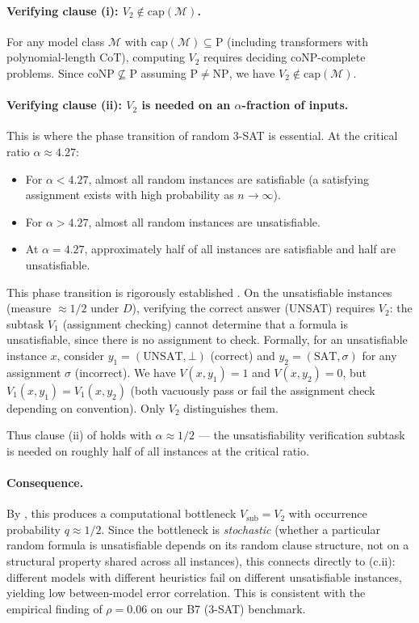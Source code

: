 \documentclass{article}
\theoremstyle{definition}
\theoremstyle{remark}
\newcommand{\PTIME}{\mathrm{P}}
\newcommand{\NP}{\mathrm{NP}}
\newcommand{\coNP}{\mathrm{coNP}}
\newcommand{\calM}{\mathcal{M}}         %
\begin{document}
\paragraph{Verifying clause (i): $V_2 \notin \mathrm{cap}(\calM)$.}
For any model class $\calM$ with $\mathrm{cap}(\calM) \subseteq \PTIME$ (including transformers with polynomial-length CoT), computing $V_2$ requires deciding $\coNP$-complete problems. Since $\coNP \not\subseteq \PTIME$ assuming $\PTIME \neq \NP$, we have $V_2 \notin \mathrm{cap}(\calM)$.

\paragraph{Verifying clause (ii): $V_2$ is needed on an $\alpha$-fraction of inputs.}
This is where the phase transition of random 3-SAT is essential. At the critical ratio $\alpha \approx 4.27$:
\begin{itemize}
    \item For $\alpha < 4.27$, almost all random instances are satisfiable (a satisfying assignment exists with high probability as $n \to \infty$).
    \item For $\alpha > 4.27$, almost all random instances are unsatisfiable.
    \item At $\alpha = 4.27$, approximately half of all instances are satisfiable and half are unsatisfiable.
\end{itemize}
This phase transition is rigorously established \citep{mezard2002analytic}.
On the unsatisfiable instances (measure $\approx 1/2$ under $D$), verifying the correct answer (UNSAT) requires $V_2$: the subtask $V_1$ (assignment checking) cannot determine that a formula is unsatisfiable, since there is no assignment to check.
Formally, for an unsatisfiable instance $x$, consider $y_1 = (\text{UNSAT}, \bot)$ (correct) and $y_2 = (\text{SAT}, \sigma)$ for any assignment $\sigma$ (incorrect). We have $V(x, y_1) = 1$ and $V(x, y_2) = 0$, but $V_1(x, y_1) = V_1(x, y_2)$ (both vacuously pass or fail the assignment check depending on convention). Only $V_2$ distinguishes them.

Thus clause (ii) of  holds with $\alpha \approx 1/2$ --- the unsatisfiability verification subtask is needed on roughly half of all instances at the critical ratio.

\paragraph{Consequence.}
By , this produces a computational bottleneck $V_{\mathrm{sub}} = V_2$ with occurrence probability $q \approx 1/2$. Since the bottleneck is \emph{stochastic} (whether a particular random formula is unsatisfiable depends on its random clause structure, not on a structural property shared across all instances), this connects directly to (c.ii): different models with different heuristics fail on different unsatisfiable instances, yielding low between-model error correlation. This is consistent with the empirical finding of $\rho = 0.06$ on our B7 (3-SAT) benchmark.
\end{document}
